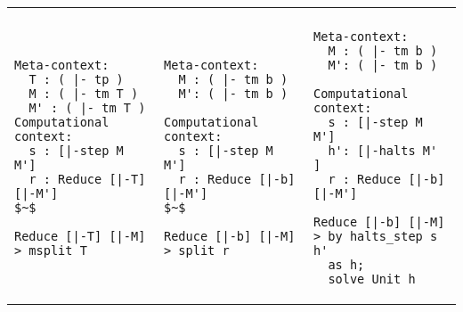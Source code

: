 \NextHarpoonProof
\centering

\newcommand{\cwidthOne}{0.33\textwidth}
\newcommand{\cwidthTwo}{0.33\textwidth}
\newcommand{\cwidthThree}{0.34\textwidth}

\newenvironment{eventable}{%
  \begin{tabular}{p{\cwidthOne}|p{\cwidthTwo}|p{\cwidthThree}}%
    }{%
  \end{tabular}
}

\begin{eventable}
  \step{bwd:msplit-T} & \step{bwd:b-invert-r} & \step{bwd:b-solve} \tabularnewline

\begin{lstlisting}
Meta-context:
  T : ( |- tp )
  M : ( |- tm T )
  M' : ( |- tm T )
Computational context:
  s : [|-step M M']
  r : Reduce [|-T] [|-M']
$~$
\end{lstlisting}


\begin{lstlisting}
Reduce [|-T] [|-M]
> msplit T
\end{lstlisting}
  &

\begin{lstlisting}
Meta-context:
  M : ( |- tm b )
  M': ( |- tm b )

Computational context:
  s : [|-step M M']
  r : Reduce [|-b] [|-M']
$~$
\end{lstlisting}


\begin{lstlisting}
Reduce [|-b] [|-M]
> split r
\end{lstlisting}
&
\begin{lstlisting}
Meta-context:
  M : ( |- tm b )
  M': ( |- tm b )

Computational context:
  s : [|-step M M']
  h': [|-halts M' ]
  r : Reduce [|-b] [|-M']
\end{lstlisting}
\begin{lstlisting}
Reduce [|-b] [|-M]
> by halts_step s h'
  as h;
  solve Unit h
\end{lstlisting}
\end{eventable}



\caption{%
  Backwards closed lemma. Step 1: Case analysis of the type
  \lstinline!T!; Steps 2 and 3: Base case (\lstinline!T!~$=$~\lstinline!b!).
}
\label{fig:bwd-closed-harpoon}

